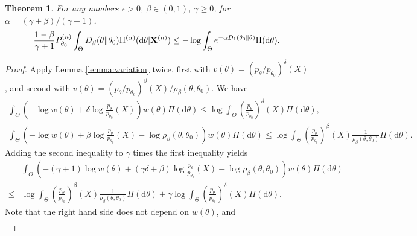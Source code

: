 \documentclass[11pt]{article}
\theoremstyle{plain}
\newtheorem{theorem}{\quad\quad Theorem}
\theoremstyle{definition}
\theoremstyle{remark}
\begin{document}
\begin{theorem}
    For any numbers $\epsilon > 0$, $\beta \in (0,1)$, $\gamma \geq 0$, for $\alpha = (\gamma + \beta)/ (\gamma + 1)$,
    \begin{equation*}
        \frac{1-\beta}{\gamma + 1}
        P_{\theta_0}^{(n)}
        \int_{\Theta}
    D_{\beta}(\theta \| \theta_0)
        \Pi^{(\alpha)}( \mathrm d \theta |\mathbf{X}^{(n)})
        \leq
-\log \int_{\Theta}  e^{- \alpha D_1(\theta_0\| \theta)} \Pi(\mathrm d \theta) .
    \end{equation*}
    \label{Subhashis2017Fundamentals}
\end{theorem}
\begin{proof}
    Apply Lemma \ref{lemma:variation} twice, first with $v(\theta) = (p_{\theta} / p_{\theta_0})^{\delta} (X)$, and second with $v(\theta) = (p_{\theta} / p_{\theta_0})^\beta (X) / \rho_{\beta}(\theta , \theta_0) $.
    We have
    \begin{align*}
        \int_{\Theta} \left( -\log w(\theta) + \delta \log \frac{p_\theta}{p_{\theta_0}}(X) \right) w(\theta) \Pi(\mathrm d \theta) \leq 
        \log \int_{\Theta} \left(\frac{p_\theta }{ p_{\theta_0}}\right)^\delta (X) \Pi (\mathrm d \theta),
    \end{align*}
    \begin{align*}
        \int_{\Theta} \left( -\log w(\theta) + \beta \log \frac{p_\theta}{p_{\theta_0}}(X) - \log \rho_\beta (\theta, \theta_0) \right) w(\theta) \Pi(\mathrm d \theta) \leq 
        \log \int_{\Theta} \left(\frac{p_\theta }{ p_{\theta_0}}\right)^\beta (X) \frac{1}{\rho_\beta (\theta, \theta_0)} \Pi (\mathrm d \theta).
    \end{align*}
    Adding the second inequality to $\gamma$ times the first inequality yields
    \begin{align*}
        &\int_{\Theta} \left( -(\gamma + 1) \log w(\theta) + (  \gamma\delta + \beta  ) \log \frac{p_\theta}{p_{\theta_0}}(X) - \log \rho_\beta (\theta, \theta_0) \right) w(\theta) \Pi(\mathrm d \theta) 
        \\
        \leq 
        &\log \int_{\Theta} \left(\frac{p_\theta }{ p_{\theta_0}}\right)^\beta (X) \frac{1}{\rho_\beta (\theta, \theta_0)} \Pi (\mathrm d \theta)
        +
        \gamma
        \log \int_{\Theta} \left(\frac{p_\theta }{ p_{\theta_0}}\right)^\delta (X) \Pi (\mathrm d \theta).
    \end{align*}
    Note that the right hand side does not depend on $w(\theta)$, and
    \begin{align*}

\end{align*}
\end{proof}
\end{document}
